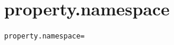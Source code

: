 \section{property.namespace}
\label{configuration:PropertyNamespace}
\AvailableInCsharpOnly{\TODO}
\begin{lstlisting}[style=Props,caption={Usage example for \textit{property.namespace}}]
property.namespace=
\end{lstlisting}